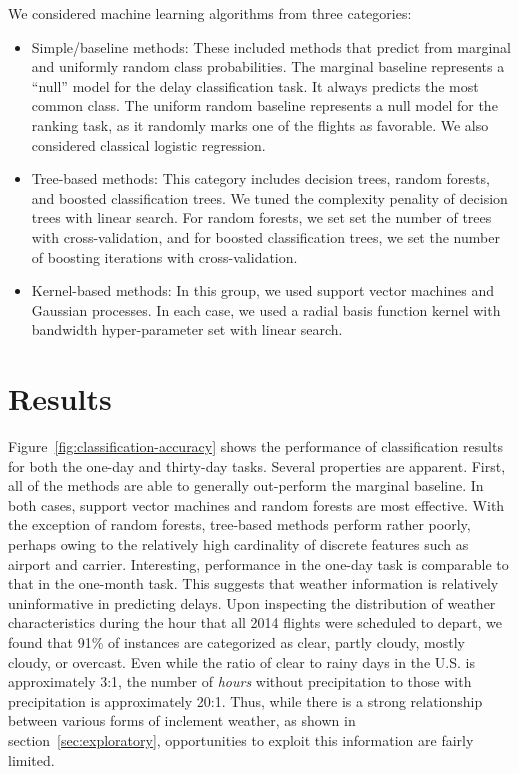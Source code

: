 \documentclass[twocolumn]{article}
\begin{document}
We considered machine learning algorithms from three categories:
\begin{itemize}
    \item Simple/baseline methods: These included methods that predict from marginal and uniformly random class probabilities. The marginal baseline represents a ``null'' model for the delay classification task. It always predicts the most common class. The uniform random baseline represents a null model for the ranking task, as it randomly marks one of the flights as favorable. We also considered classical logistic regression.
    \item Tree-based methods: This category includes decision trees, random forests, and boosted classification trees. We tuned the complexity penality of decision trees with linear search. For random forests, we set set the number of trees with cross-validation, and for boosted classification trees, we set the number of boosting iterations with cross-validation.
    \item Kernel-based methods: In this group, we used support vector machines and Gaussian processes. In each case, we used a radial basis function kernel with bandwidth hyper-parameter set with linear search.
\end{itemize}

\section{Results}
\label{sec:results}

Figure~\ref{fig:classification-accuracy} shows the performance of classification results for both the one-day and thirty-day tasks. Several properties are apparent. First, all of the methods are able to generally out-perform the marginal baseline. In both cases, support vector machines and random forests are most effective. With the exception of random forests, tree-based methods perform rather poorly, perhaps owing to the relatively high cardinality of discrete features such as airport and carrier. Interesting, performance in the one-day task is comparable to that in the one-month task. This suggests that weather information is relatively uninformative in predicting delays. Upon inspecting the distribution of weather characteristics during the hour that all 2014 flights were scheduled to depart, we found that 91\% of instances are categorized as clear, partly cloudy, mostly cloudy, or overcast. Even while the ratio of clear to rainy days in the U.S. is approximately 3:1, the number of \emph{hours} without precipitation to those with precipitation is approximately 20:1. Thus, while there is a strong relationship between various forms of inclement weather, as shown in section~\ref{sec:exploratory}, opportunities to exploit this information are fairly limited.
\end{document}

